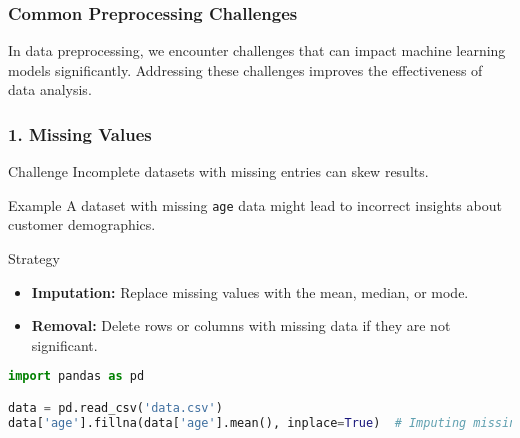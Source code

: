 \documentclass{beamer}
\begin{document}
\begin{frame}[fragile]
    \frametitle{Common Preprocessing Challenges}
    In data preprocessing, we encounter challenges that can impact machine learning models significantly. Addressing these challenges improves the effectiveness of data analysis.
\end{frame}

\begin{frame}[fragile]
    \frametitle{1. Missing Values}
    \begin{block}{Challenge}
        Incomplete datasets with missing entries can skew results.
    \end{block}
    
    \begin{block}{Example}
        A dataset with missing \texttt{age} data might lead to incorrect insights about customer demographics.
    \end{block}
    
    \begin{block}{Strategy}
        \begin{itemize}
            \item \textbf{Imputation:} Replace missing values with the mean, median, or mode.
            \item \textbf{Removal:} Delete rows or columns with missing data if they are not significant.
        \end{itemize}
    \end{block}
    
    \begin{lstlisting}[language=Python]
import pandas as pd

data = pd.read_csv('data.csv')
data['age'].fillna(data['age'].mean(), inplace=True)  # Imputing missing values with mean
    \end{lstlisting}
\end{frame}
\end{document}
